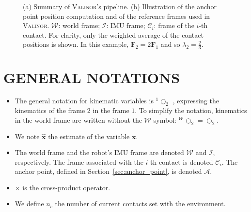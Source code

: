\documentclass{IJCAS}
\begin{document}
\begin{figure}[!ht]
      \hfill
    \caption{(a) Summary of {\scshape Valinor}'s pipeline. (b) Illustration of the anchor point position computation and of the reference frames used in {\scshape Valinor}. $\mathcal{W}$: world frame; $\mathcal{I}$: IMU frame; $\mathcal{C}_{i}$: frame of the $i$-th contact. For clarity, only the weighted average of the contact positions is shown. In this example, $\boldsymbol{F}_{2} = 2\boldsymbol{F}_{1}$ and so $\lambda_{2} = \frac{2}{3}$.}
\end{figure}


\section{GENERAL NOTATIONS}
\begin{itemize}
    \item The general notation for kinematic variables is $^{1}\bigcirc_{2}$ , expressing the kinematics of the frame $2$ in the frame $1$. To simplify the notation, kinematics in the world frame are written without the $\mathcal{W}$ symbol: $^{\mathcal{W}}\bigcirc_{2}=\bigcirc_{2}$.
    \item We note $\hat{\boldsymbol{x}}$ the estimate of the variable $\boldsymbol{x}$.
    \item The world frame and the robot's IMU frame are denoted $\mathcal{W}$ and $\mathcal{I}$, respectively. The frame associated with the $i$-th contact is denoted $\mathcal{C}_{i}$. The anchor point, defined in Section~\ref{sec:anchor_point}, is denoted $\mathcal{A}$. 
    \item $\times$ is the cross-product operator. 
    \item We define $n_c$ the number of current contacts set with the environment.
    
\end{itemize} 
\end{document}
